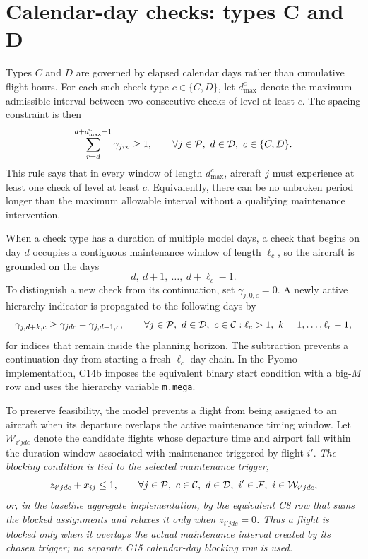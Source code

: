 \section{Calendar-day checks: types C and D}
\label{sec:hierarchy_cd}

Types $C$ and $D$ are governed by elapsed calendar days rather than cumulative
 flight hours. For each such check type $c\in\{C,D\}$, let
 $d_{\max}^{c}$ denote the maximum admissible interval between two consecutive
 checks of level at least $c$. The spacing constraint is then
\begin{equation}
    \sum_{r=d}^{d+d_{\max}^{c}-1}\gamma_{jrc} \geq 1,
    \qquad \forall j \in \mathcal{P},\ d \in \mathcal{D},\ c\in\{C,D\}.
    \label{eq:spacing_cd}
\end{equation}
This rule says that in every window of length $d_{\max}^{c}$, aircraft $j$ must
experience at least one check of level at least $c$. Equivalently, there can be
no unbroken period longer than the maximum allowable interval without a qualifying
 maintenance intervention.

When a check type has a duration of multiple model days, a check that begins on
day $d$ occupies a contiguous maintenance window of length $\ell_c$, so the
aircraft is grounded on the days
\begin{equation}
    d,\ d+1,\ \ldots,\ d+\ell_c-1.
\end{equation}
To distinguish a new check from its continuation, set
$\gamma_{j,0,c}=0$. A newly active hierarchy indicator is propagated to the
following days by
\begin{equation}
    \gamma_{j,d+k,c} \geq \gamma_{jdc}-\gamma_{j,d-1,c},
    \qquad \forall j\in\mathcal{P},\ d\in\mathcal{D},\ c\in\mathcal{C}:\ell_c>1,\
    k=1,\ldots,\ell_c-1,
    \label{eq:multi_day_check}
\end{equation}
for indices that remain inside the planning horizon. The subtraction prevents
a continuation day from starting a fresh $\ell_c$-day chain. In the Pyomo
implementation, C14b imposes the equivalent binary start condition with a
big-$M$ row and uses the hierarchy variable \texttt{m.mega}.

To preserve feasibility, the model prevents a flight from being assigned to an
aircraft when its departure overlaps the active maintenance timing window. Let
$\mathcal W_{i'jdc}$ denote the candidate flights whose departure time and airport
fall within the duration window associated with maintenance triggered by flight
$i'$. \textit{The blocking condition is tied to the selected maintenance trigger,}
\begin{equation}
    z_{i'jdc}+x_{ij}\leq1,
    \qquad \forall j\in\mathcal{P},\ c\in\mathcal{C},\ d\in\mathcal{D},\ i'\in\mathcal{F},
    \ i\in\mathcal W_{i'jdc},
    \label{eq:no_flight_during_maintenance}
\end{equation}
\textit{or, in the baseline aggregate implementation, by the equivalent
C8 row that sums the blocked assignments and relaxes it only when
$z_{i'jdc}=0$. Thus a flight is blocked only when it overlaps the actual
maintenance interval created by its chosen trigger; no separate C15
calendar-day blocking row is used.}

